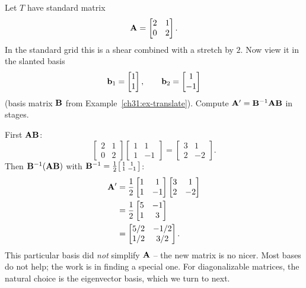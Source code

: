 \begin{example}
\label{ch31:ex-shear-diag}
Let $T$ have standard matrix
\[
  \mathbf{A} = \begin{bmatrix} 2 & 1\\ 0 & 2\end{bmatrix}.
\]
In the standard grid this is a shear combined with a stretch by $2$. Now view it in
the slanted basis
\[
  \mathbf{b}_1=\begin{bmatrix}1\\1\end{bmatrix},\qquad \mathbf{b}_2=\begin{bmatrix}1\\-1\end{bmatrix}
\]
(basis matrix $\mathbf{B}$ from Example~\ref{ch31:ex-translate}). Compute
$\mathbf{A}'=\mathbf{B}^{-1}\mathbf{A}\mathbf{B}$ in stages.

First $\mathbf{A}\mathbf{B}$:
\[
  \begin{bmatrix} 2 & 1\\ 0 & 2\end{bmatrix}\begin{bmatrix} 1 & 1\\ 1 & -1\end{bmatrix}
  = \begin{bmatrix} 3 & 1\\ 2 & -2\end{bmatrix}.
\]
Then $\mathbf{B}^{-1}(\mathbf{A}\mathbf{B})$ with $\mathbf{B}^{-1}=\tfrac12\begin{bsmallmatrix}1&1\\1&-1\end{bsmallmatrix}$:
\begin{align*}
  \mathbf{A}' &= \frac12\begin{bmatrix} 1 & 1\\ 1 & -1\end{bmatrix}\begin{bmatrix} 3 & 1\\ 2 & -2\end{bmatrix} \\
  &= \frac12\begin{bmatrix} 5 & -1\\ 1 & 3\end{bmatrix} \\
  &= \begin{bmatrix} 5/2 & -1/2\\ 1/2 & 3/2\end{bmatrix}.
\end{align*}
This particular basis did \emph{not} simplify $\mathbf{A}$ -- the new matrix is no
nicer. Most bases do not help; the work is in finding a special one. For
diagonalizable matrices, the natural choice is the eigenvector basis, which we turn to next.
\end{example}

